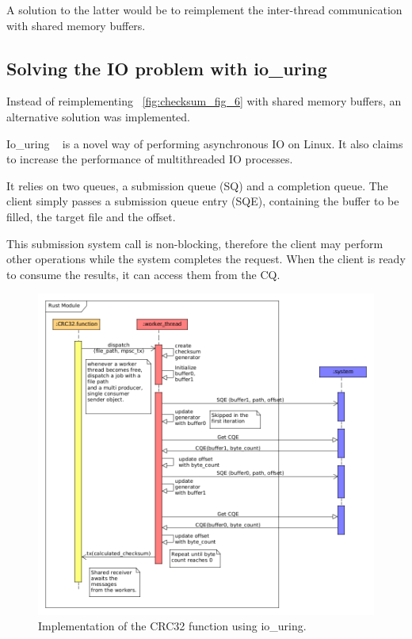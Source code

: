 A solution to the latter would be to reimplement the inter-thread communication with shared memory buffers.


\subsection{Solving the IO problem with io\_uring}
Instead of reimplementing ~\ref{fig:checksum_fig_6} with shared memory buffers, an alternative
solution was implemented.

Io\_uring ~\cite{IO_uring} is a novel way of performing asynchronous IO on Linux.
It also claims to increase the performance of multithreaded IO processes.

It relies on two queues, a submission queue (SQ) and a completion queue.
The client simply passes a submission queue entry (SQE), containing the buffer to be filled,
the target file and the offset.

This submission system call is non-blocking, therefore the client may perform other operations
while the system completes the request.
When the client is ready to consume the results,
it can access them from the CQ\@.

\begin{figure}[!htb]
    \centering
    \includegraphics[width=12cm]{figures/checksum/uring_multi_crc}
    \caption{Implementation of the CRC32 function using io\_uring.}
    \label{fig:checksum_fig_8}
\end{figure}


